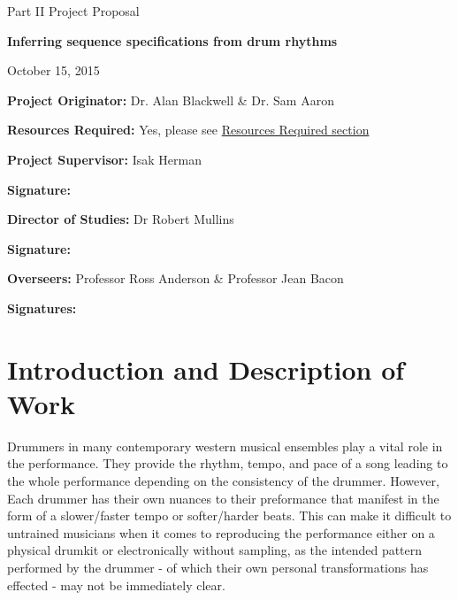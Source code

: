 \documentclass[12pt,a4]{article}
\begin{document}
	\thispagestyle{empty}

	\medskip
	\medskip

	\vfil

	\centerline{\large Part II Project Proposal}
	\vspace{0.4in}
	\centerline{\Large\bf Inferring sequence specifications from drum rhythms}
	\centerline{\large October 15, 2015}

	\vfil

	{\bf Project Originator:} Dr. Alan Blackwell \& Dr. Sam Aaron

	\vspace{0.1in}

	{\bf Resources Required:} Yes, please see \hyperref[sec:Resources]{Resources Required section}

	\vspace{0.5in}

	{\bf Project Supervisor:} Isak Herman

	\vspace{0.2in}

	{\bf Signature:}

	\vspace{0.5in}

	{\bf Director of Studies:} Dr Robert Mullins

	\vspace{0.2in}

	{\bf Signature:}

	\vspace{0.5in}

	{\bf Overseers:} Professor Ross Anderson \& Professor Jean Bacon

	\vspace{0.2in}

	{\bf Signatures:}


	\vfil

	\eject

	\section{Introduction and Description of Work}

Drummers in many contemporary western musical ensembles play a vital role in the performance. They provide the rhythm, tempo, and pace of a song leading to the whole performance depending on the consistency of the drummer. However, Each drummer has their own nuances to their preformance that manifest in the form of a slower/faster tempo or softer/harder beats. This can make it difficult to untrained musicians when it comes to reproducing the performance either on a physical drumkit or electronically without sampling, as the intended pattern performed by the drummer - of which their own personal transformations has effected - may not be immediately clear.
\end{document}
